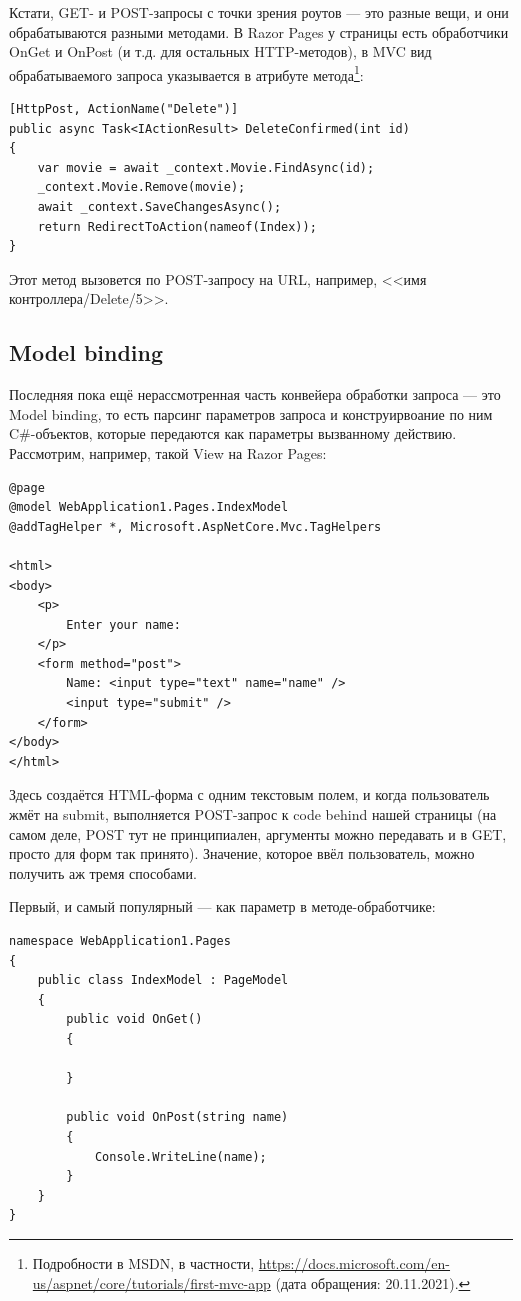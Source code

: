 \documentclass[a5paper]{article}
\begin{document}
Кстати, GET- и POST-запросы с точки зрения роутов --- это разные вещи, и они обрабатываются разными методами. В Razor Pages у страницы есть обработчики OnGet и OnPost (и т.д. для остальных HTTP-методов), в MVC вид обрабатываемого запроса указывается в атрибуте метода\footnote{Подробности в MSDN, в частности, \url{https://docs.microsoft.com/en-us/aspnet/core/tutorials/first-mvc-app} (дата обращения: 20.11.2021).}:

\begin{verbatim}
[HttpPost, ActionName("Delete")]
public async Task<IActionResult> DeleteConfirmed(int id)
{
    var movie = await _context.Movie.FindAsync(id);
    _context.Movie.Remove(movie);
    await _context.SaveChangesAsync();
    return RedirectToAction(nameof(Index));
}
\end{verbatim}

Этот метод вызовется по POST-запросу на URL, например, <<имя контроллера/Delete/5>>.

\subsection{Model binding}

Последняя пока ещё нерассмотренная часть конвейера обработки запроса --- это Model binding, то есть парсинг параметров запроса и конструирвоание по ним C\#-объектов, которые передаются как параметры вызванному действию. Рассмотрим, например, такой View на Razor Pages:

\begin{verbatim}
@page
@model WebApplication1.Pages.IndexModel
@addTagHelper *, Microsoft.AspNetCore.Mvc.TagHelpers

<html>
<body>
    <p>
        Enter your name:
    </p>
    <form method="post">
        Name: <input type="text" name="name" />
        <input type="submit" />
    </form>
</body>
</html>
\end{verbatim}

Здесь создаётся HTML-форма с одним текстовым полем, и когда пользователь жмёт на submit, выполняется POST-запрос к code behind нашей страницы (на самом деле, POST тут не принципиален, аргументы можно передавать и в GET, просто для форм так принято). Значение, которое ввёл пользователь, можно получить аж тремя способами.

Первый, и самый популярный --- как параметр в методе-обработчике:

\begin{verbatim}
namespace WebApplication1.Pages
{
    public class IndexModel : PageModel
    {
        public void OnGet()
        {

        }

        public void OnPost(string name)
        {
            Console.WriteLine(name);
        }
    }
}
\end{verbatim}
\end{document}
